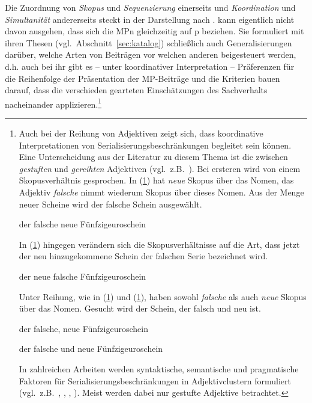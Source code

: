 Die Zuordnung von \textit{Skopus} und \textit{Sequenzierung} einerseits und \textit{Koordination} und \textit{Simultanität} andererseits steckt in der Darstellung nach \citet{Lindner1991}.\linebreak \citet{Thurmair1989, Thurmair1991} kann eigentlich nicht davon ausgehen, dass sich die MPn gleichzeitig auf p beziehen. Sie formuliert mit ihren Thesen (vgl.\ Abschnitt~\ref{sec:katalog}) schließlich auch Generalisierungen darüber, welche Arten von Beiträgen vor welchen anderen beigesteuert werden, d.h. auch bei ihr gibt es – unter koordinativer Interpretation – Präferenzen für die Reihenfolge der Präsentation der MP-Beiträge und die Kriterien bauen darauf, dass die verschieden gearteten Einschätzungen des Sachverhalts nacheinander applizieren.\footnote{Auch bei der Reihung von Adjektiven zeigt sich, dass koordinative Interpretationen von Serialisierungsbeschränkungen begleitet sein können. Eine Unterscheidung aus der Literatur zu diesem Thema ist die zwischen \textit{gestuften} und \textit{gereihten} Adjektiven (vgl.\ z.B.\ \citealt[348--350]{Trost2006}). Bei ersteren wird von einem Skopusverhältnis gesprochen. In (\ref{xyz}) hat \textit{neue} Skopus über das Nomen, das Adjektiv \textit{falsche} nimmt wiederum Skopus über dieses Nomen. Aus der Menge neuer Scheine wird der falsche Schein ausgewählt.

\begin{exe}
	\ex\label{xyz} 
	der falsche neue Fünfzigeuroschein
	\hfill\hbox{\citet[438]{Trost2006}}
\end{exe}
In (\ref{abc}) hingegen verändern sich die Skopusverhältnisse auf die Art, dass jetzt der neu hinzugekommene Schein der falschen Serie bezeichnet wird.

\begin{exe}
	\ex\label{abc} 
	der neue falsche Fünfzigeuroschein
	\hfill\hbox{\citet[349]{Trost2006}}
\end{exe}
Unter Reihung, wie in (\ref{ghj}) und (\ref{jkl}), haben sowohl \textit{falsche} als auch \textit{neue} Skopus über das Nomen. Gesucht wird der Schein, der falsch und neu ist.

\begin{exe}
	\ex\label{ghj} 
	der falsche, neue Fünfzigeuroschein
\end{exe}
\begin{exe}
	\ex\label{jkl} 
	der falsche und neue Fünfzigeuroschein
	\hfill\hbox{\citet[349]{Trost2006}}
\end{exe}
In zahlreichen Arbeiten werden syntaktische, semantische und pragmatische Faktoren für Serialisierungsbeschränkungen in Adjektivclustern formuliert (vgl.\ z.B.\ \citealt{Posner1980}, \citealt{Eichinger1991}, \citealt{Trost2006}, \citealt{Eroms2011}). Meist werden dabei nur gestufte Adjektive betrachtet. 

}

